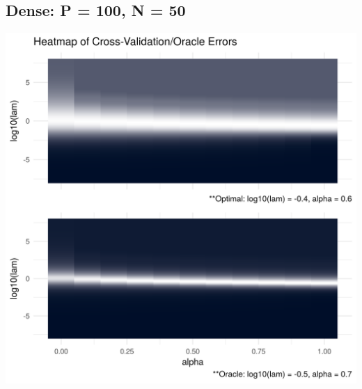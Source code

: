\documentclass[11pt,]{book}
\theoremstyle{definition}
\theoremstyle{definition}
\theoremstyle{definition}
\theoremstyle{remark}
\begin{document}
\newpage

\hypertarget{dense-p-100-n-50}{%
\subsection{Dense: P = 100, N = 50}\label{dense-p-100-n-50}}

\includegraphics{images/repsKLdenseQR_N50_P100.png}

\vspace{0.5cm}
\end{document}

